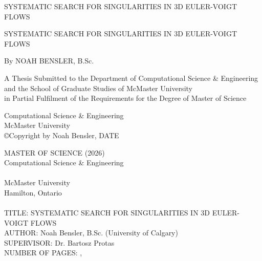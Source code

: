 \documentclass[12pt]{article}
\numberwithin{equation}{section}
\begin{document}
\begin{titlepage}
   \begin{center}
       \vspace*{1cm}

	   SYSTEMATIC SEARCH FOR SINGULARITIES IN 3D EULER-VOIGT FLOWS
	   
   \end{center}
\end{titlepage}

\setcounter{page}{0}
\begin{titlepage}
   \begin{center}
       \vspace*{3.8cm}

       SYSTEMATIC SEARCH FOR SINGULARITIES IN 3D EULER-VOIGT FLOWS

       \vspace{2.5cm}

       By NOAH BENSLER, B.Sc.

       \vfill
            
       A Thesis Submitted to the Department of Computational Science \& Engineering\\
        and the School of Graduate Studies of McMaster University \\
        in Partial Fulfilment of the Requirements
 for the Degree of Master of Science
            
       \vspace{0.8cm}
     
            
       Computational Science \& Engineering\\
       McMaster University\\
       ©Copyright by Noah Bensler, DATE
            
   \end{center}
\end{titlepage}
\restoregeometry

\setcounter{page}{2}
\begin{flushleft}
\thispagestyle{plain}
       \vspace*{3.8cm}
            
       MASTER OF SCIENCE (2026) \\
       Computational Science \& Engineering
       \\~\\
       McMaster University\\
       Hamilton, Ontario
       \\~\\
       TITLE: SYSTEMATIC SEARCH FOR SINGULARITIES IN 3D EULER-VOIGT FLOWS\\
       AUTHOR: Noah Bensler, B.Sc. (University of Calgary)\\
       SUPERVISOR: Dr. Bartosz Protas\\
       NUMBER OF PAGES: ,

\end{flushleft}
\end{document}

